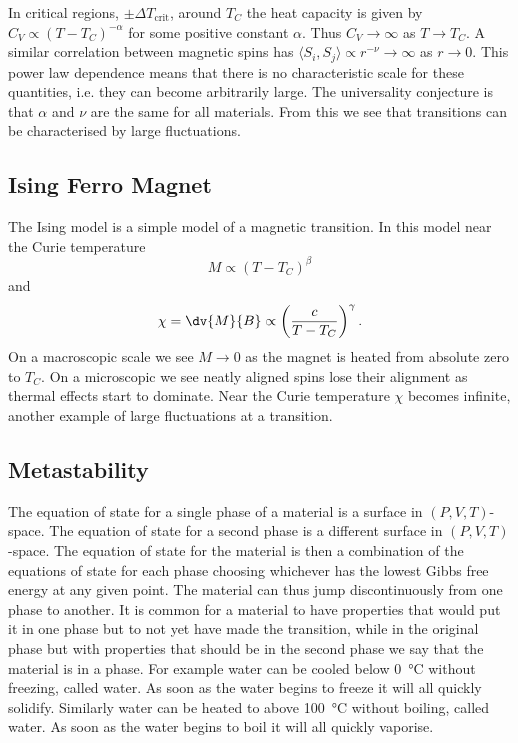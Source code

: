     In critical regions, \(\pm\Delta T_{\text{crit}}\), around \(T_C\) the heat capacity is given by \(C_V \propto (T - T_C)^{-\alpha}\) for some positive constant \(\alpha\).
    Thus \(C_V\to\infty\) as \(T \to T_C\).
    A similar correlation between magnetic spins has \(\langle S_i, S_j\rangle \propto r^{-\nu}\to\infty\) as \(r\to 0\).
    This power law dependence means that there is no characteristic scale for these quantities, i.e. they can become arbitrarily large.
    The universality conjecture is that \(\alpha\) and \(\nu\) are the same for all materials.
    From this we see that transitions can be characterised by large fluctuations.
    
    \subsection{Ising Ferro Magnet}
    The Ising model is a simple model of a magnetic transition.
    In this model near the Curie temperature
    \[M \propto (T - T_C)^{\beta}\]
    and
    \[\chi = \dv{M}{B} \propto \left(\frac{c}{T - T_C}\right)^{\gamma}.\]
    On a macroscopic scale we see \(M \to 0\) as the magnet is heated from absolute zero to \(T_C\).
    On a microscopic we see neatly aligned spins lose their alignment as thermal effects start to dominate.
    Near the Curie temperature \(\chi\) becomes infinite, another example of large fluctuations at a transition.
    
    \subsection{Metastability}
    The equation of state for a single phase of a material is a surface in \((P, V, T)\)-space.
    The equation of state for a second phase is a different surface in \((P, V, T)\)-space.
    The equation of state for the material is then a combination of the equations of state for each phase choosing whichever has the lowest Gibbs free energy at any given point.
    The material can thus jump discontinuously from one phase to another.
    It is common for a material to have properties that would put it in one phase but to not yet have made the transition, while in the original phase but with properties that should be in the second phase we say that the material is in a  phase.
    For example water can be cooled below \SI{0}{\degreeCelsius} without freezing, called  water.
    As soon as the water begins to freeze it will all quickly solidify.
    Similarly water can be heated to above \SI{100}{\degreeCelsius} without boiling, called  water.
    As soon as the water begins to boil it will all quickly vaporise.
    
